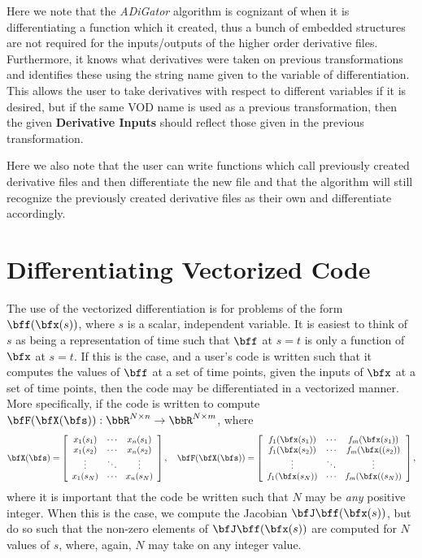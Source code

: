 \documentclass[10pt,pdftex]{article}
\begin{document}
Here we note that the \emph{ADiGator} algorithm is cognizant of when it is differentiating a function which it created, thus a bunch of embedded structures are not required for the inputs/outputs of the higher order derivative files. Furthermore, it knows what derivatives were taken on previous transformations and identifies these using the string name given to the variable of differentiation. This allows the user to take derivatives with respect to different variables if it is desired, but if the same VOD name is used as a previous transformation, then the given {\bf Derivative Inputs} should reflect those given in the previous transformation.

Here we also note that the user can write functions which call previously created derivative files and then differentiate the new file and that the algorithm will still recognize the previously created derivative files as their own and differentiate accordingly.

\section{Differentiating Vectorized Code}
The use of the vectorized differentiation is for problems of the form $\bff(\bfx(s))$, where $s$ is a scalar, independent variable. It is easiest to think of $s$ as being a representation of time such that $\bff$ at $s = t$ is only a function of $\bfx$ at $s = t$. If this is the case, and a user's code is written such that it computes the values of $\bff$ at a set of time points, given the inputs of $\bfx$ at a set of time points, then the code may be differentiated in a vectorized manner. More specifically, if the code is written to compute $\bfF(\bfX(\bfs)): \bbR^{N \times n} \rightarrow \bbR^{N \times m}$, where
\begin{equation}
\bfX(\bfs) = \left[ \begin{array}{ccc}
x_1(s_1) & \cdots & x_n(s_1)\\
x_1(s_2) & \cdots & x_n(s_2)\\
\vdots & \ddots & \vdots \\
x_1(s_N) & \cdots & x_n(s_N)
\end{array}\right], \quad
\bfF(\bfX(\bfs)) = \left[ \begin{array}{ccc}
f_1(\bfx(s_1)) & \cdots & f_m(\bfx(s_1))\\
f_1(\bfx(s_2)) & \cdots & f_m(\bfx((s_2))\\
\vdots & \ddots & \vdots \\
f_1(\bfx(s_N)) & \cdots & f_m(\bfx((s_N))
\end{array}\right],
\end{equation}
where it is important that the code be written such that $N$ may be \emph{any} positive integer. When this is the case, we compute the Jacobian $\bfJ\bff(\bfx(s))$, but do so such that the non-zero elements of $\bfJ\bff(\bfx(s))$ are computed for $N$ values of $s$, where, again, $N$ may take on any integer value.
\end{document}
